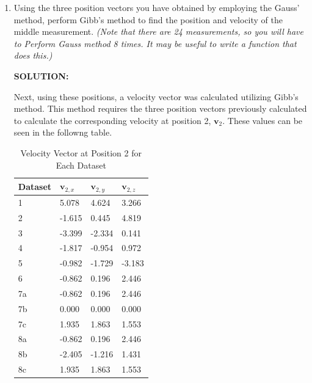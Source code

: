 \documentclass[12pt, letterpaper]{aiaa-tc}
\begin{document}
\begin{enumerate}
    \item Using the three position vectors you have obtained by employing the Gauss' method, perform Gibb's method
    to find the position and velocity of the middle measurement. \textit{(Note that there are 24 measurements, so you
    will have to Perform Gauss method 8 times. It may be useful to write a function that does this.)}
    
    \textbf{SOLUTION:}
    
    Next, using these positions, a velocity vector was calculated utilizing Gibb’s method. This method requires the three position 
    vectors previously calculated to calculate the corresponding velocity at position 2, $\bm{v}_{2}$. These values can be seen in the followng table.

    \begin{table}[]
        \centering
        \begin{tabular}{|l|lll|}
        \hline
        Dataset & $\bm{v}_{2,x}$              & $\bm{v}_{2,y}$              & $\bm{v}_{2,z}$        \\ \hline
        1       & \multicolumn{1}{l|}{5.078}  & \multicolumn{1}{l|}{4.624}  & 3.266  \\ \hline
        2       & \multicolumn{1}{l|}{-1.615} & \multicolumn{1}{l|}{0.445}  & 4.819  \\ \hline
        3       & \multicolumn{1}{l|}{-3.399} & \multicolumn{1}{l|}{-2.334} & 0.141  \\ \hline
        4       & \multicolumn{1}{l|}{-1.817} & \multicolumn{1}{l|}{-0.954} & 0.972  \\ \hline
        5       & \multicolumn{1}{l|}{-0.982} & \multicolumn{1}{l|}{-1.729} & -3.183 \\ \hline
        6       & \multicolumn{1}{l|}{-0.862} & \multicolumn{1}{l|}{0.196}  & 2.446  \\ \hline
        7a      & \multicolumn{1}{l|}{-0.862} & \multicolumn{1}{l|}{0.196}  & 2.446  \\ \hline
        7b      & \multicolumn{1}{l|}{0.000}  & \multicolumn{1}{l|}{0.000}  & 0.000  \\ \hline
        7c      & \multicolumn{1}{l|}{1.935}  & \multicolumn{1}{l|}{1.863}  & 1.553  \\ \hline
        8a      & \multicolumn{1}{l|}{-0.862} & \multicolumn{1}{l|}{0.196}  & 2.446  \\ \hline
        8b      & \multicolumn{1}{l|}{-2.405} & \multicolumn{1}{l|}{-1.216} & 1.431  \\ \hline
        8c      & \multicolumn{1}{l|}{1.935}  & \multicolumn{1}{l|}{1.863}  & 1.553  \\ \hline
        \end{tabular}
        \caption{Velocity Vector at Position 2 for Each Dataset}
    \end{table}


\end{enumerate}
\end{document}
